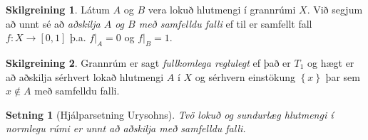 \documentclass[a4paper,icelandic]{book}
\theoremstyle{definition}
\newtheorem{skilgr}{Skilgreining}[section]
\theoremstyle{plain}
\newtheorem{setn}{Setning}[section]
\theoremstyle{remark}
\begin{document}
\begin{skilgr}
  Látum $A$ og $B$ vera lokuð hlutmengi í grannrúmi $X$. Við segjum að
  unnt sé að \emph{aðskilja $A$ og $B$ með samfelldu
  falli} ef til er samfellt fall
  $f:X\to\left[ 0,1 \right]$ þ.a. $f|_A = 0$ og $f|_B = 1$.
\end{skilgr}
\begin{skilgr}
  Grannrúm er sagt \emph{fullkomlega reglulegt} ef það er $T_1$ og hægt er að aðskilja sérhvert
  lokað hlutmengi $A$ í $X$ og sérhvern einstökung $\left\{ x
  \right\}$ þar sem $x\notin A$ með samfelldu falli.
\end{skilgr}
\begin{setn}
  [Hjálparsetning Urysohns]
  Tvö lokuð og sundurlæg hlutmengi í normlegu rúmi er unnt að aðskilja
  með samfelldu falli.
\end{setn}
\end{document}
